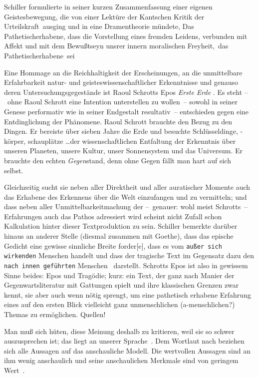 Schiller formulierte in seiner kurzen Zusammenfassung einer eigenen
  Geistesbewegung, die von einer Lektüre der Kantschen \glqq Kritik der
  Urteilskraft\grqq\ ausging und in eine Dramentheorie mündete, \glqq Das
  Pathetischerhabene\grqq, dass die \glqq Vorstellung eines fremden Leidens,
  verbunden mit Affekt und mit dem Bewu\ss tseyn unsrer innern moralischen
  Freyheit,\grqq\ das \glqq Pathetischerhabene\grqq\ sei
  \citep[S. ? f.]{SchillerPathetischErhaben}

Eine Hommage an die Reichhaltigkeit der Erscheinungen, an die unmittelbare
  Erfahrbarkeit natur- und geisteswissenschaftlicher Erkenntnisse und genauso
  deren Untersuchungsgegestände ist Raoul Schrotts Epos \emph{Erste Erde}
  \citep{Schrott2016ErsteErde}.
Es steht --~ohne Raoul Schrott eine Intention unterstellen zu wollen~--
  sowohl in seiner Genese performativ wie in seiner Endgestalt resultativ~--
  entschieden gegen eine Entdinglichung der Phänomene. Raoul Schrott brauchte
  den Bezug zu den Dingen. Er bereiste über sieben Jahre die Erde und besuchte
  Schlüsseldinge, -körper, schauplätze \ldots der wissenschaftlichen
  Entfaltung der Erkenntnis über unseren Planeten, unsere Kultur, unser
  Sonnensystem und das Universum. Er brauchte den echten \emph{Gegen}stand,
   \glqq denn ohne Gegen fällt man hart auf sich selbst.\grqq\ \citep[S.
   60]{Han2016}

Gleichzeitig sucht sie neben aller Direktheit und aller auratischer Momente
  auch das Erhabene des Erkennens über die Welt einzufangen und zu vermitteln;
  und dass neben aller Unmittelbarkeitmachung der --~genauer: wohl meist
  Schrotts~-- Erfahrungen auch das Pathos adressiert wird scheint nicht Zufall
  schon Kalkulation hinter dieser Textproduktion zu sein.
Schiller bemerkte darüber hinaus an anderer Stelle (diesmal zusammen mit
  Goethe), dass das epische Gedicht \glqq eine gewisse sinnliche Breite
  forder[e]\grqq, dass es vom \glqq\texttt{au\ss er sich wirkenden} Menschen
  handelt und dass der tragische Text im Gegensatz dazu den \glqq\texttt{nach
  innen geführten} Menschen \grqq\ darstellt.
Schrotts Epos ist also in gewissem Sinne beides: Epos und Tragödie; kurz: ein
  Text, der ganz nach Manier der Gegenwartsliteratur mit Gattungen spielt und
  ihre klassischen Grenzen zwar kennt, sie aber auch wenn nötig sprengt, um
  eine pathetisch erhabene Erfahrung eines auf den ersten Blick vielleicht
  ganz unmenschlichen (a-menschlichen?) Themas zu ermöglichen. 
Quellen!

\glqq Man muß sich hüten, diese Meinung deshalb zu kritieren, weil sie so
  schwer auszusprechen ist; das liegt an unserer Sprache\grqq\
  \citep{Schroedinger1935}. 
\glqq Dem Wortlaut nach beziehen sich alle Aussagen auf das anschauliche
  Modell. Die wertvollen Aussagen sind an ihm wenig anschaulich und seine
  anschaulichen Merkmale sind von geringem Wert\grqq\ \citep{Schroedinger1935}.

